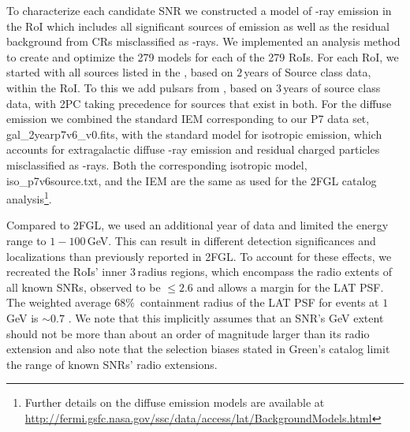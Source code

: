 {

To characterize each candidate SNR we constructed a %
model of \g-ray emission in the RoI which includes all significant sources of emission as well as the residual background from CRs misclassified as \g-rays. We implemented an analysis method to create and optimize the 279 models for each of the 279 RoIs. For each RoI, we started with all sources listed in 
the \twofgl \citep{2FGL}, based on $2$\,years of Source class data, within the RoI. To this we add pulsars from \twopc \citep{2PC}, based on $3$\,years of source class data, with 2PC taking precedence for sources that exist in both. 
For the diffuse emission we combined the standard IEM corresponding to our P7 data set, gal\_2yearp7v6\_v0.fits, with the standard %
model for isotropic emission, which accounts for extragalactic diffuse \g-ray emission and residual charged particles misclassified as \g-rays. 
Both the corresponding isotropic model, iso\_p7v6source.txt, and the IEM are the same as used for the 2FGL catalog analysis\footnote{Further details on the diffuse emission models are available at \url{http://fermi.gsfc.nasa.gov/ssc/data/access/lat/BackgroundModels.html}}.

Compared to 2FGL, we used an additional year of data and limited the energy range to $1-100$\,GeV. This can result in different detection significances and localizations than previously reported in 2FGL. To account for these effects, we recreated the RoIs' inner $3$\degr{}\,radius regions, which encompass the radio extents of all known SNRs, observed to be $\leq 2.6$\degr{} and allows a margin for the LAT PSF. 
The weighted average $68\%$~containment radius of the LAT PSF for %
events at $1$\,GeV is $\sim0.7$\degr{} \citep{lat_cm}. 
We note that this implicitly assumes that an SNR's GeV extent should not be more than about an order of magnitude larger than its radio extension and also note that the selection biases stated in Green's catalog limit the range of known SNRs' radio extensions. 

}
